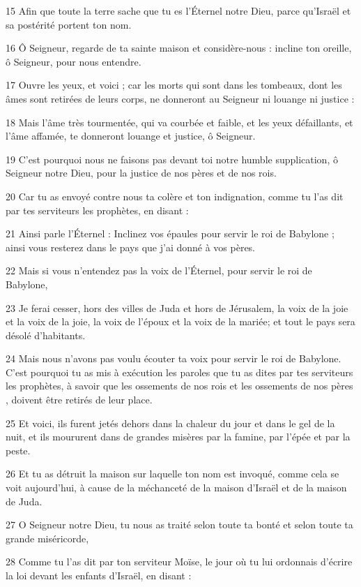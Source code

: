 \par 15 Afin que toute la terre sache que tu es l'Éternel notre Dieu, parce qu'Israël et sa postérité portent ton nom.
\par 16 Ô Seigneur, regarde de ta sainte maison et considère-nous : incline ton oreille, ô Seigneur, pour nous entendre.
\par 17 Ouvre les yeux, et voici ; car les morts qui sont dans les tombeaux, dont les âmes sont retirées de leurs corps, ne donneront au Seigneur ni louange ni justice :
\par 18 Mais l'âme très tourmentée, qui va courbée et faible, et les yeux défaillants, et l'âme affamée, te donneront louange et justice, ô Seigneur.
\par 19 C'est pourquoi nous ne faisons pas devant toi notre humble supplication, ô Seigneur notre Dieu, pour la justice de nos pères et de nos rois.
\par 20 Car tu as envoyé contre nous ta colère et ton indignation, comme tu l'as dit par tes serviteurs les prophètes, en disant :
\par 21 Ainsi parle l'Éternel : Inclinez vos épaules pour servir le roi de Babylone ; ainsi vous resterez dans le pays que j'ai donné à vos pères.
\par 22 Mais si vous n'entendez pas la voix de l'Éternel, pour servir le roi de Babylone,
\par 23 Je ferai cesser, hors des villes de Juda et hors de Jérusalem, la voix de la joie et la voix de la joie, la voix de l'époux et la voix de la mariée; et tout le pays sera désolé d'habitants.
\par 24 Mais nous n'avons pas voulu écouter ta voix pour servir le roi de Babylone. C'est pourquoi tu as mis à exécution les paroles que tu as dites par tes serviteurs les prophètes, à savoir que les ossements de nos rois et les ossements de nos pères , doivent être retirés de leur place.
\par 25 Et voici, ils furent jetés dehors dans la chaleur du jour et dans le gel de la nuit, et ils moururent dans de grandes misères par la famine, par l'épée et par la peste.
\par 26 Et tu as détruit la maison sur laquelle ton nom est invoqué, comme cela se voit aujourd'hui, à cause de la méchanceté de la maison d'Israël et de la maison de Juda.
\par 27 O Seigneur notre Dieu, tu nous as traité selon toute ta bonté et selon toute ta grande miséricorde,
\par 28 Comme tu l'as dit par ton serviteur Moïse, le jour où tu lui ordonnais d'écrire la loi devant les enfants d'Israël, en disant :
